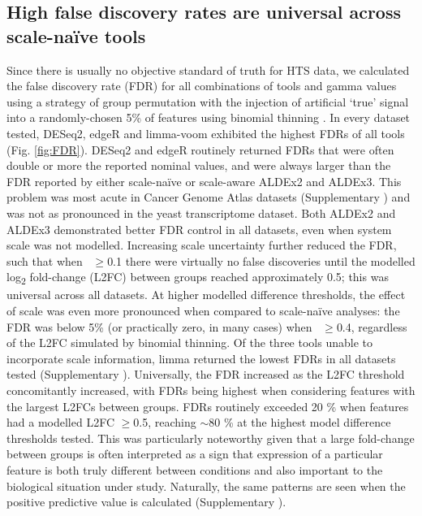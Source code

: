 \documentclass[10pt,letterpaper]{article}
\begin{document}

\subsection*{High false discovery rates are universal across scale-na\"ive tools}
Since there is usually no objective standard of truth for HTS data, we calculated the false discovery rate (FDR) for all combinations of tools and gamma values using a strategy of group permutation with the injection of artificial `true' signal into a randomly-chosen 5\% of features using binomial thinning \cite{gerard_data-based_2020}. In every dataset tested, DESeq2, edgeR and limma-voom exhibited the highest FDRs of all tools (Fig. \ref{fig:FDR}). DESeq2 and edgeR routinely returned FDRs that were often double or more the reported nominal values, and were always larger than the FDR reported by either scale-na\"ive or scale-aware ALDEx2 and ALDEx3. This problem was most acute in Cancer Genome Atlas datasets (Supplementary ) and was not as pronounced in the yeast transcriptome dataset. Both ALDEx2 and ALDEx3 demonstrated better FDR control in all datasets, even when system scale was not modelled. Increasing scale uncertainty further reduced the FDR, such that when \textgamma~$\geq$0.1 there were virtually no false discoveries until the modelled log\textsubscript{2} fold-change (L2FC) between groups reached approximately 0.5; this was universal across all datasets. At higher modelled difference thresholds, the effect of scale was even more pronounced when compared to scale-na\"ive analyses: the FDR was below 5\% (or practically zero, in many cases) when \textgamma~$\geq$0.4, regardless of the L2FC simulated by binomial thinning. Of the three tools unable to incorporate scale information, limma returned the lowest FDRs in all datasets tested (Supplementary ). Universally, the FDR increased as the L2FC threshold concomitantly increased, with FDRs being highest when considering features with the largest L2FCs between groups. FDRs routinely exceeded 20 \% when features had a modelled L2FC $\geq$0.5, reaching $\sim$80 \% at the highest model difference thresholds tested. This was particularly noteworthy given that a large fold-change between groups is often interpreted as a sign that expression of a particular feature is both truly different between conditions and also important to the biological situation under study. Naturally, the same patterns are seen when the positive predictive value is calculated (Supplementary ).
\end{document}

